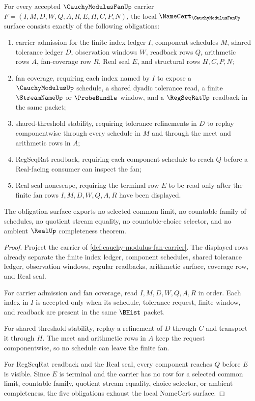 \begin{theorem}
\label{thm:cauchy-modulus-fan-namecert-obligations}
For every accepted $\CauchyModulusFanUp$ carrier $F=(I,M,D,W,Q,A,R,E,H,C,P,N)$, the local $\NameCert_{\CauchyModulusFanUp}$ surface consists exactly of the following obligations:
\begin{enumerate}
\item carrier admission for the finite index ledger $I$, component schedules $M$, shared tolerance ledger $D$, observation windows $W$, readback rows $Q$, arithmetic rows $A$, fan-coverage row $R$, Real seal $E$, and structural rows $H,C,P,N$;
\item fan coverage, requiring each index named by $I$ to expose a $\CauchyModulusUp$ schedule, a shared dyadic tolerance read, a finite $\StreamNameUp$ or $\ProbeBundle$ window, and a $\RegSeqRatUp$ readback in the same packet;
\item shared-threshold stability, requiring tolerance refinements in $D$ to replay componentwise through every schedule in $M$ and through the meet and arithmetic rows in $A$;
\item RegSeqRat readback, requiring each component schedule to reach $Q$ before a Real-facing consumer can inspect the fan;
\item Real-seal nonescape, requiring the terminal row $E$ to be read only after the finite fan rows $I,M,D,W,Q,A,R$ have been displayed.
\end{enumerate}
The obligation surface exports no selected common limit, no countable family of schedules, no quotient stream equality, no countable-choice selector, and no ambient $\RealUp$ completeness theorem.
\end{theorem}
\begin{proof}
Project the carrier of \autoref{def:cauchy-modulus-fan-carrier}. The displayed rows already separate the finite index ledger, component schedules, shared tolerance ledger, observation windows, regular readbacks, arithmetic surface, coverage row, and Real seal.

For carrier admission and fan coverage, read $I,M,D,W,Q,A,R$ in order. Each index in $I$ is accepted only when its schedule, tolerance request, finite window, and readback are present in the same $\BHist$ packet.

For shared-threshold stability, replay a refinement of $D$ through $C$ and transport it through $H$. The meet and arithmetic rows in $A$ keep the request componentwise, so no schedule can leave the finite fan.

For RegSeqRat readback and the Real seal, every component reaches $Q$ before $E$ is visible. Since $E$ is terminal and the carrier has no row for a selected common limit, countable family, quotient stream equality, choice selector, or ambient completeness, the five obligations exhaust the local NameCert surface.
\end{proof}

